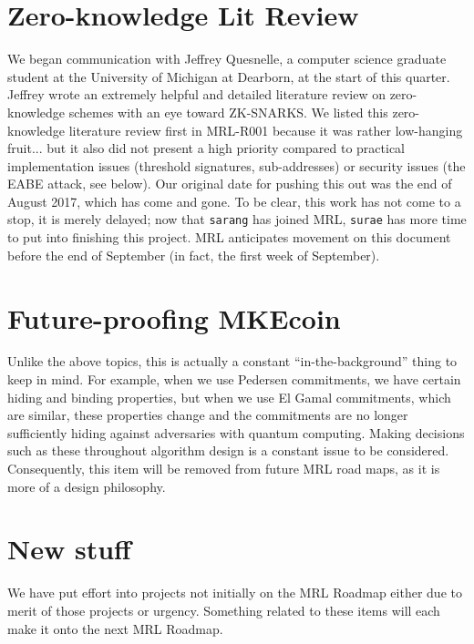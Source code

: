 \documentclass[12pt,english]{mrl}
\theoremstyle{definition}
\numberwithin{equation}{section}
\numberwithin{figure}{section}
\numberwithin{equation}{section}
\numberwithin{equation}{section}
\numberwithin{figure}{section}
\begin{document}
    
\section{Zero-knowledge Lit Review} 

We began communication with Jeffrey Quesnelle, a computer science graduate student at the University of Michigan at Dearborn, at the start of this quarter. Jeffrey wrote an extremely helpful and detailed literature review on zero-knowledge schemes with an eye toward ZK-SNARKS. We listed this zero-knowledge literature review first in MRL-R001 because it was rather low-hanging fruit... but it also did not present a high priority compared to practical implementation issues (threshold signatures, sub-addresses) or security issues (the EABE attack, see below). Our original date for pushing this out was the end of August 2017, which has come and gone. To be clear, this work has not come to a stop, it is merely delayed; now that \texttt{sarang} has joined MRL, \texttt{surae} has more time to put into finishing this project. MRL anticipates movement on this document before the end of September (in fact, the first week of September).
    
    
\section{Future-proofing MKEcoin} 

Unlike the above topics, this is actually a constant ``in-the-background'' thing to keep in mind. For example, when we use Pedersen commitments, we have certain hiding and binding properties, but when we use El Gamal commitments, which are similar, these properties change and the commitments are no longer sufficiently hiding against adversaries with quantum computing. Making decisions such as these throughout algorithm design is a constant issue to be considered. Consequently, this item will be removed from future MRL road maps, as it is more of a design philosophy.
    
\section{New stuff}

We have put effort into projects not initially on the MRL Roadmap either due to merit of those projects or urgency. Something related to these items will each make it onto the next MRL Roadmap.
\end{document}
